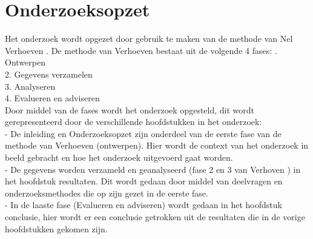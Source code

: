 \section{Onderzoeksopzet}
Het onderzoek wordt opgezet door gebruik te maken van de  methode van Nel Verhoeven \Parencite{Verhoeven}.
De methode van Verhoeven bestaat uit de volgende 4 fases:
. Ontwerpen \\
2. Gegevens verzamelen \\
3. Analyseren \\
4. Evalueren en adviseren \\
\whitespace
Door middel van de fases wordt het onderzoek opgesteld, dit wordt gerepresenteerd door de verschillende hoofdstukken in het onderzoek: \\
- De inleiding en Onderzoeksopzet zijn onderdeel van de eerste fase van de methode van Verhoeven (ontwerpen).
Hier wordt de context van het onderzoek in beeld gebracht en hoe het onderzoek uitgevoerd gaat worden. \\ 
- De gegevens worden verzameld en geanalyseerd (fase 2 en 3 van Verhoven \Parencite{Verhoeven}) in het hoofdstuk resultaten.
Dit wordt gedaan door middel van deelvragen en onderzoeksmethodes die op zijn gezet in de eerste fase.\\ 
- In de laaste fase (Evalueren en adviseren) wordt gedaan in het hoofdstuk conclusie, hier wordt er een conclusie getrokken uit de resultaten die in de vorige hoofdstukken gekomen zijn.
